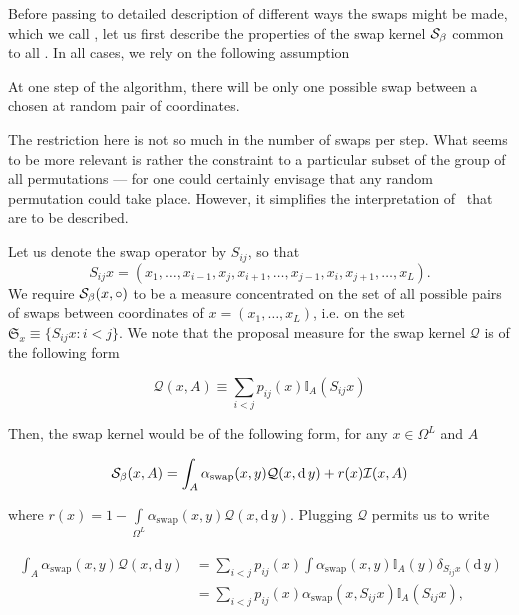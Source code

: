 Before passing to detailed description of different ways the swaps might be made, which we call \strats, let us first describe the properties of the swap kernel $\mathcal{S}_{\beta}$ common to all \strats. In all cases, we rely on the following assumption

\begin{assumptions}[resume]
	\item At one step of the algorithm, there will be only one possible swap between a chosen at random pair of coordinates.
\end{assumptions}

The restriction here is not so much in the number of swaps per step. What seems to be more relevant is rather the constraint to a particular subset of the group of all permutations --- for one could certainly envisage that any random permutation could take place. However, it simplifies the interpretation of \strats\, that are to be described. 

Let us denote the swap operator by $S_{ij}$, so that 
$$S_{ij} x = (x_1, \dots, x_{i-1}, x_j, x_{i+1}, \dots, x_{j-1}, x_i, x_{j+1}, \dots, x_L).$$ 
We require $\mathcal{S}_{\beta}(x, \circ )$ to be a measure concentrated on the set of all possible pairs of swaps between coordinates of $x = (x_1, \dots, x_L)$, i.e. on the set $\mathfrak{S}_x \equiv \{ S_{ij}x : i < j  \}$. We note that the proposal measure for the swap kernel $\mathcal{Q}$ is of the following form 

\begin{equation*}
	\mathcal{Q}(x, A) \equiv \underset{i < j}{\sum} p_{ij}(x) \mathbb{I}_A (S_{ij} x)
\end{equation*}	 

Then, the swap kernel would be of the following form, for any $x \in \Omega^L$ and $A$

\begin{equation*}
	\mathcal{S}_{\beta}(x,A) = \int_{A} \alpha_\text{swap} (x,y) \mathcal{Q}(x, \mathrm{d}\,y) + r(x) \mathcal{I}(x,A)
\end{equation*}	

where $r(x) = 1 - \underset{\Omega^L}{\int} \alpha_\text{swap} (x,y) \mathcal{Q}(x, \mathrm{d}\,y) $. Plugging $\mathcal{Q}$ permits us to write

\begin{align*}
	\begin{split}
		\int_{A} \alpha_\text{swap} (x,y) \mathcal{Q}(x, \mathrm{d}\,y) &= \underset{ i < j}{\sum} p_{ij}(x) \int \alpha_\text{swap} (x,y) \mathbb{I}_A (y) \delta_{S_{ij}x}(\mathrm{d}\, y) \\ &= \underset{ i < j}{\sum} p_{ij}(x) \alpha_\text{swap} (x, S_{ij}x) \mathbb{I}_A(S_{ij} x),
	\end{split}
\end{align*}	

